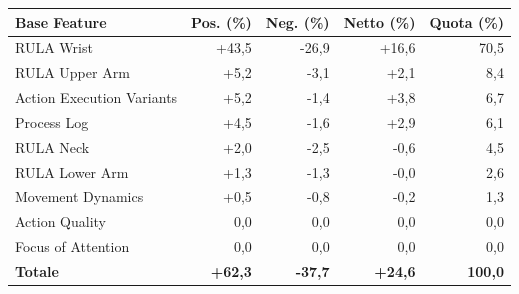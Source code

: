 \begin{tabular*}{\linewidth}{@{}l@{\extracolsep{\fill}}rrrr@{}}
\toprule
\textbf{Base Feature} & \textbf{Pos. (\%)} & \textbf{Neg. (\%)} & \textbf{Netto (\%)} & \textbf{Quota (\%)} \\
\midrule
RULA Wrist & +43{,}5 & -26{,}9 & +16{,}6 & 70{,}5 \\
RULA Upper Arm & +5{,}2 & -3{,}1 & +2{,}1 & 8{,}4 \\
Action Execution Variants & +5{,}2 & -1{,}4 & +3{,}8 & 6{,}7 \\
Process Log & +4{,}5 & -1{,}6 & +2{,}9 & 6{,}1 \\
RULA Neck & +2{,}0 & -2{,}5 & -0{,}6 & 4{,}5 \\
RULA Lower Arm & +1{,}3 & -1{,}3 & -0{,}0 & 2{,}6 \\
Movement Dynamics & +0{,}5 & -0{,}8 & -0{,}2 & 1{,}3 \\
Action Quality & 0{,}0 & 0{,}0 & 0{,}0 & 0{,}0 \\
Focus of Attention & 0{,}0 & 0{,}0 & 0{,}0 & 0{,}0 \\
\midrule
\textbf{Totale} & \textbf{+62{,}3} & \textbf{-37{,}7} & \textbf{+24{,}6} & \textbf{100{,}0} \\
\bottomrule
\end{tabular*}
